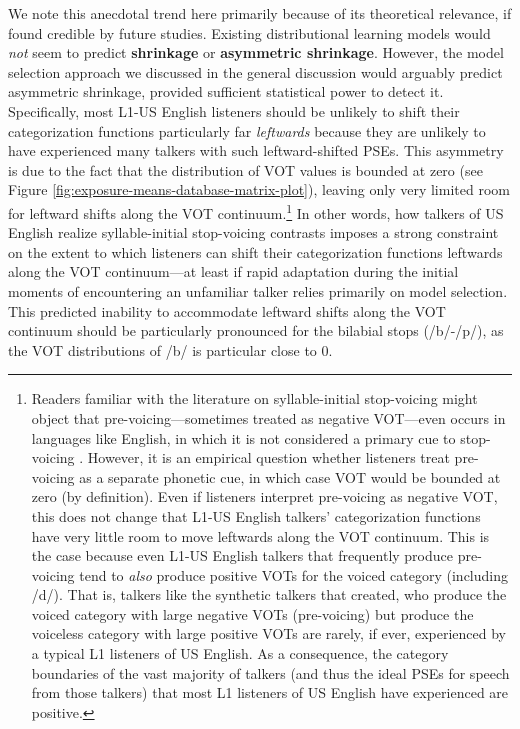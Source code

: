 \documentclass[
  11pt,
  man,mask,floatsintext]{apa6}
\begin{document}
We note this anecdotal trend here primarily because of its theoretical relevance, if found credible by future studies. Existing distributional learning models would \emph{not} seem to predict \textbf{shrinkage} or \textbf{asymmetric shrinkage}. However, the model selection approach we discussed in the general discussion would arguably predict asymmetric shrinkage, provided sufficient statistical power to detect it. Specifically, most L1-US English listeners should be unlikely to shift their categorization functions particularly far \emph{leftwards} because they are unlikely to have experienced many talkers with such leftward-shifted PSEs. This asymmetry is due to the fact that the distribution of VOT values is bounded at zero (see Figure \ref{fig:exposure-means-database-matrix-plot}), leaving only very limited room for leftward shifts along the VOT continuum.\footnote{Readers familiar with the literature on syllable-initial stop-voicing might object that pre-voicing---sometimes treated as negative VOT---even occurs in languages like English, in which it is not considered a primary cue to stop-voicing \autocite[ did not annotate pre-voicing]{chodroff-wilson2018}. However, it is an empirical question whether listeners treat pre-voicing as a separate phonetic cue, in which case VOT would be bounded at zero (by definition). Even if listeners interpret pre-voicing as negative VOT, this does not change that L1-US English talkers' categorization functions have very little room to move leftwards along the VOT continuum. This is the case because even L1-US English talkers that frequently produce pre-voicing tend to \emph{also} produce positive VOTs for the voiced category (including /d/). That is, talkers like the synthetic talkers that \textcite{kleinschmidt2020} created, who produce the voiced category with large negative VOTs (pre-voicing) but produce the voiceless category with large positive VOTs are rarely, if ever, experienced by a typical L1 listeners of US English. As a consequence, the category boundaries of the vast majority of talkers (and thus the ideal PSEs for speech from those talkers) that most L1 listeners of US English have experienced are positive.} In other words, how talkers of US English realize syllable-initial stop-voicing contrasts imposes a strong constraint on the extent to which listeners can shift their categorization functions leftwards along the VOT continuum---at least if rapid adaptation during the initial moments of encountering an unfamiliar talker relies primarily on model selection. This predicted inability to accommodate leftward shifts along the VOT continuum should be particularly pronounced for the bilabial stops (/b/-/p/), as the VOT distributions of /b/ is particular close to 0.
\end{document}
